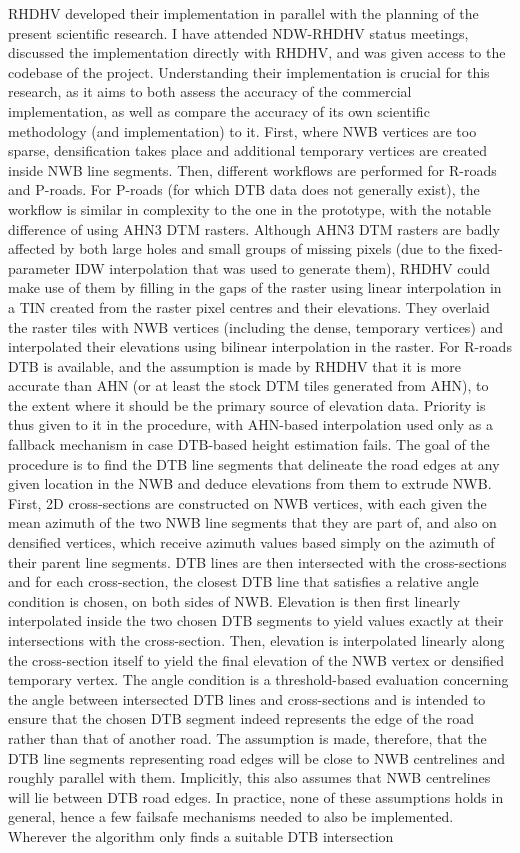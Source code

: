RHDHV developed their implementation in parallel with the planning of the present scientific research. I have attended NDW-RHDHV status meetings, discussed the implementation directly with RHDHV, and was given access to the codebase of the project. Understanding their implementation is crucial for this research, as it aims to both assess the accuracy of the commercial implementation, as well as compare the accuracy of its own scientific methodology (and implementation) to it. First, where NWB vertices are too sparse, densification takes place and additional temporary vertices are created inside NWB line segments. Then, different workflows are performed for R-roads and P-roads. For P-roads (for which DTB data does not generally exist), the workflow is similar in complexity to the one in the prototype, with the notable difference of using AHN3 DTM rasters. Although AHN3 DTM rasters are badly affected by both large holes and small groups of missing pixels (due to the fixed-parameter IDW interpolation that was used to generate them), RHDHV could make use of them by filling in the gaps of the raster using linear interpolation in a TIN created from the raster pixel centres and their elevations. They overlaid the raster tiles with NWB vertices (including the dense, temporary vertices) and interpolated their elevations using bilinear interpolation in the raster. For R-roads DTB is available, and the assumption is made by RHDHV that it is more accurate than AHN (or at least the stock DTM tiles generated from AHN), to the extent where it should be the primary source of elevation data. Priority is thus given to it in the procedure, with AHN-based interpolation used only as a fallback mechanism in case DTB-based height estimation fails. The goal of the procedure is to find the DTB line segments that delineate the road edges at any given location in the NWB and deduce elevations from them to extrude NWB. First, 2D cross-sections are constructed on NWB vertices, with each given the mean azimuth of the two NWB line segments that they are part of, and also on densified vertices, which receive azimuth values based simply on the azimuth of their parent line segments. DTB lines are then intersected with the cross-sections and for each cross-section, the closest DTB line that satisfies a relative angle condition is chosen, on both sides of NWB. Elevation is then first linearly interpolated inside the two chosen DTB segments to yield values exactly at their intersections with the cross-section. Then, elevation is interpolated linearly along the cross-section itself to yield the final elevation of the NWB vertex or densified temporary vertex. The angle condition is a threshold-based evaluation concerning the angle between intersected DTB lines and cross-sections and is intended to ensure that the chosen DTB segment indeed represents the edge of the road rather than that of another road. The assumption is made, therefore, that the DTB line segments representing road edges will be close to NWB centrelines and roughly parallel with them. Implicitly, this also assumes that NWB centrelines will lie between DTB road edges. In practice, none of these assumptions holds in general, hence a few failsafe mechanisms needed to also be implemented. Wherever the algorithm only finds a suitable DTB intersection 